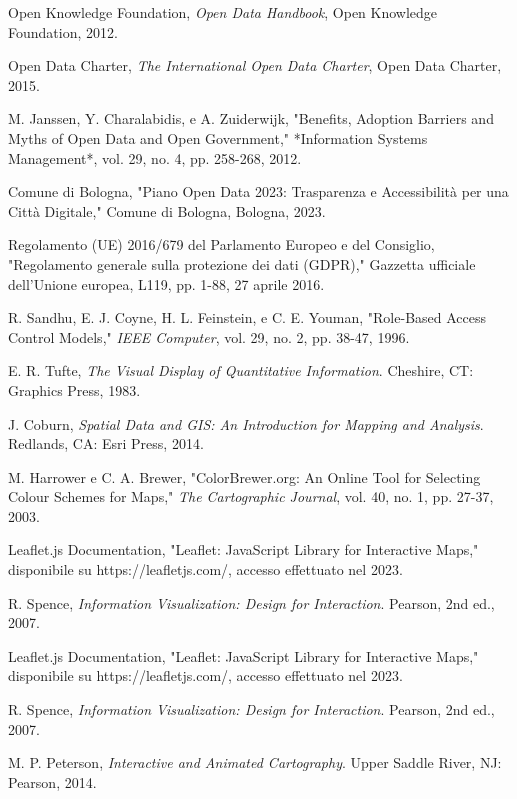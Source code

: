 \begin{thebibliography}{99}
Open Knowledge Foundation, \textit{Open Data Handbook}, Open Knowledge Foundation, 2012.

Open Data Charter, \textit{The International Open Data Charter}, Open Data Charter, 2015.

M. Janssen, Y. Charalabidis, e A. Zuiderwijk, "Benefits, Adoption Barriers and Myths of Open Data and Open Government," *Information Systems Management*, vol. 29, no. 4, pp. 258-268, 2012.

Comune di Bologna, "Piano Open Data 2023: Trasparenza e Accessibilità per una Città Digitale," Comune di Bologna, Bologna, 2023.

Regolamento (UE) 2016/679 del Parlamento Europeo e del Consiglio, "Regolamento generale sulla protezione dei dati (GDPR)," Gazzetta ufficiale dell'Unione europea, L119, pp. 1-88, 27 aprile 2016.

R. Sandhu, E. J. Coyne, H. L. Feinstein, e C. E. Youman, "Role-Based Access Control Models," \textit{IEEE Computer}, vol. 29, no. 2, pp. 38-47, 1996.

E. R. Tufte, \textit{The Visual Display of Quantitative Information}. Cheshire, CT: Graphics Press, 1983.

J. Coburn, \textit{Spatial Data and GIS: An Introduction for Mapping and Analysis}. Redlands, CA: Esri Press, 2014.

M. Harrower e C. A. Brewer, "ColorBrewer.org: An Online Tool for Selecting Colour Schemes for Maps," \textit{The Cartographic Journal}, vol. 40, no. 1, pp. 27-37, 2003.

Leaflet.js Documentation, "Leaflet: JavaScript Library for Interactive Maps," disponibile su https://leafletjs.com/, accesso effettuato nel 2023.

R. Spence, \textit{Information Visualization: Design for Interaction}. Pearson, 2nd ed., 2007.

Leaflet.js Documentation, "Leaflet: JavaScript Library for Interactive Maps," disponibile su https://leafletjs.com/, accesso effettuato nel 2023.

R. Spence, \textit{Information Visualization: Design for Interaction}. Pearson, 2nd ed., 2007.

M. P. Peterson, \textit{Interactive and Animated Cartography}. Upper Saddle River, NJ: Pearson, 2014.


\end{thebibliography}
